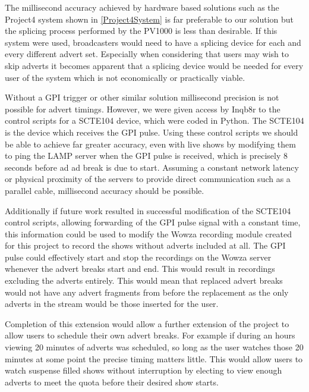 	The millisecond accuracy achieved by hardware based solutions such as the Project4 system shown in \ref{Project4System} is far preferable to our solution but the splicing process performed by the PV1000 is less than desirable. If this system were used, broadcasters would need to have a splicing device for each and every different advert set. Especially when considering that users may wish to skip adverts it becomes apparent that a splicing device would be needed for every user of the system which is not economically or practically viable.

	Without a GPI trigger or other similar solution millisecond precision is not possible for advert timings. However, we were given access by Inqb8r to the control scripts for a SCTE104 device, which were coded in Python. The SCTE104 is the device which receives the GPI pulse. Using these control scripts we should be able to achieve far greater accuracy, even with live shows by modifying them to ping the LAMP server when the GPI pulse is received, which is precisely 8 seconds before ad ad break is due to start. Assuming a constant network latency or physical proximity of the servers to provide direct communication such as a parallel cable, millisecond accuracy should be possible.
	
	Additionally if future work resulted in successful modification of the SCTE104 control scripts, allowing forwarding of the GPI pulse signal with a constant time, this information could be used to modify the Wowza recording module created for this project to record the shows without adverts included at all. The GPI pulse could effectively start and stop the recordings on the Wowza server whenever the advert breaks start and end. This would result in recordings excluding the adverts entirely. This would mean that replaced advert breaks would not have any advert fragments from before the replacement as the only adverts in the stream would be those inserted for the user.
	
	Completion of this extension would allow a further extension of the project to allow users to schedule their own advert breaks. For example if during an hours viewing 20 minutes of adverts was scheduled, so long as the user watches those 20 minutes at some point the precise timing matters little. This would allow users to watch suspense filled shows without interruption by electing to view enough adverts to meet the quota before their desired show starts.
	
